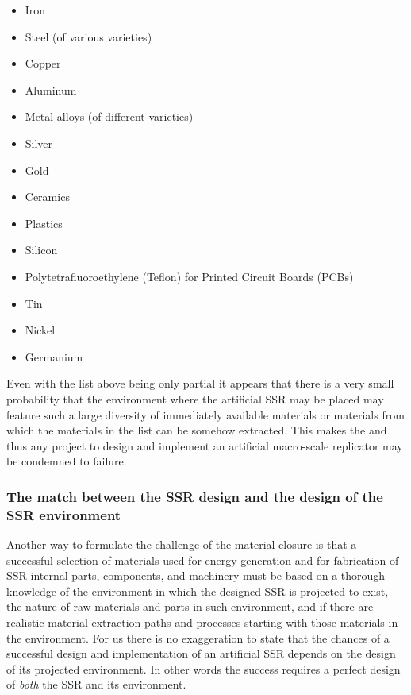 \begin{itemize}
\item Iron
\item Steel (of various varieties)
\item Copper
\item Aluminum
\item Metal alloys (of different varieties)
\item Silver
\item Gold
\item Ceramics
\item Plastics
\item Silicon
\item Polytetrafluoroethylene (Teflon) for Printed Circuit Boards
(PCBs)
\item Tin
\item Nickel
\item Germanium
\end{itemize}

Even with the list above being only partial it appears that there is a very
small probability that the environment where the artificial SSR may be
placed may feature such a large diversity of immediately available
materials or materials from which the materials in the list can be
somehow extracted. This makes the  and thus any project to design and implement an
artificial macro-scale replicator may be condemned to failure. 

\subsubsection[The match between the SSR design and the design of the
SSR environment]{The match between the SSR design and the design of the
SSR environment}

Another way to formulate the challenge of the material closure is that a
successful selection of materials used for energy generation and for
fabrication of SSR internal parts, components, and machinery must be
based on a thorough knowledge of the environment in which the designed
SSR is projected to exist, the nature of raw materials and parts in
such environment, and if there are realistic material extraction paths
and processes starting with those materials in the environment. For us
there is no exaggeration to state that the chances of a successful
design and implementation of an artificial SSR depends on the design of
its projected environment. In other words the success requires a
perfect design of \emph{both} the SSR and its environment.


